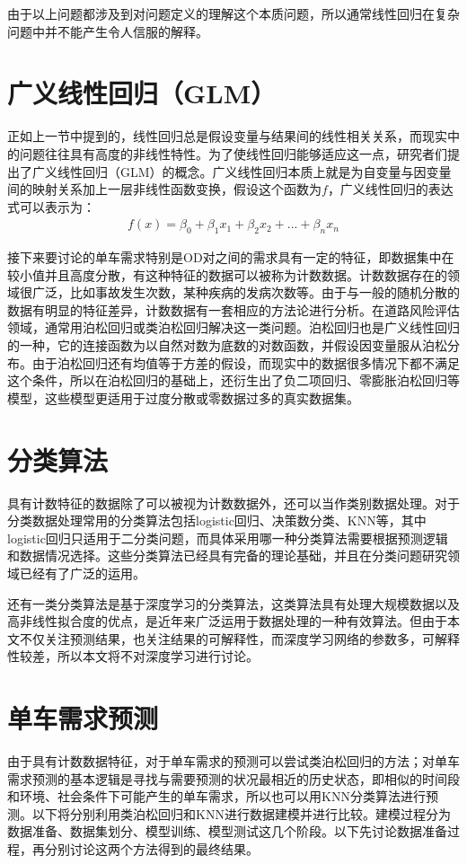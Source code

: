 \documentclass[]{tongjithesis}
\numberwithin{equation}{chapter}
\begin{document}
由于以上问题都涉及到对问题定义的理解这个本质问题，所以通常线性回归在复杂问题中并不能产生令人信服的解释。

\section{广义线性回归（GLM）}
正如上一节中提到的，线性回归总是假设变量与结果间的线性相关关系，而现实中的问题往往具有高度的非线性特性。为了使线性回归能够适应这一点，研究者们提出了广义线性回归（GLM）的概念。广义线性回归本质上就是为自变量与因变量间的映射关系加上一层非线性函数变换，假设这个函数为$f$，广义线性回归的表达式可以表示为：
\begin{align}
	f(x) = \beta_{0}+\beta_{1}x_{1}+\beta_{2}x_{2}+...+\beta_{n}x_{n}
\end{align}

接下来要讨论的单车需求特别是OD对之间的需求具有一定的特征，即数据集中在较小值并且高度分散，有这种特征的数据可以被称为计数数据。计数数据存在的领域很广泛，比如事故发生次数，某种疾病的发病次数等。由于与一般的随机分散的数据有明显的特征差异，计数数据有一套相应的方法论进行分析。在道路风险评估领域，通常用泊松回归或类泊松回归解决这一类问题\cite{mannering2014analytic}。泊松回归也是广义线性回归的一种，它的连接函数为以自然对数为底数的对数函数，并假设因变量服从泊松分布。由于泊松回归还有均值等于方差的假设，而现实中的数据很多情况下都不满足这个条件，所以在泊松回归的基础上，还衍生出了负二项回归、零膨胀泊松回归等模型，这些模型更适用于过度分散或零数据过多的真实数据集。

\section{分类算法}
具有计数特征的数据除了可以被视为计数数据外，还可以当作类别数据处理\cite{lukusa2020horvitz}。对于分类数据处理常用的分类算法包括logistic回归、决策数分类、KNN等，其中logistic回归只适用于二分类问题，而具体采用哪一种分类算法需要根据预测逻辑和数据情况选择。这些分类算法已经具有完备的理论基础，并且在分类问题研究领域已经有了广泛的运用。

还有一类分类算法是基于深度学习的分类算法，这类算法具有处理大规模数据以及高非线性拟合度的优点，是近年来广泛运用于数据处理的一种有效算法。但由于本文不仅关注预测结果，也关注结果的可解释性，而深度学习网络的参数多，可解释性较差，所以本文将不对深度学习进行讨论。

\section{单车需求预测}
由于具有计数数据特征，对于单车需求的预测可以尝试类泊松回归的方法；对单车需求预测的基本逻辑是寻找与需要预测的状况最相近的历史状态，即相似的时间段和环境、社会条件下可能产生的单车需求，所以也可以用KNN分类算法进行预测。以下将分别利用类泊松回归和KNN进行数据建模并进行比较。建模过程分为数据准备、数据集划分、模型训练、模型测试这几个阶段。以下先讨论数据准备过程，再分别讨论这两个方法得到的最终结果。
\end{document}
